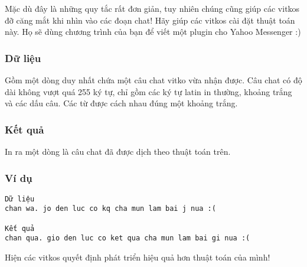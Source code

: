    Mặc dù đây là những quy tắc rất đơn giản, tuy nhiên chúng cũng giúp các vitkos đỡ căng mắt khi nhìn vào các đoạn chat! Hãy giúp các vitkos cài đặt thuật toán này. Họ sẽ dùng chương trình của bạn để viết một plugin cho Yahoo Messenger :)  

\subsubsection{   Dữ liệu  }

   Gồm một dòng duy nhất chứa một câu chat vitko vừa nhận được. Câu chat có độ dài không vượt quá 255 ký tự, chỉ gồm các ký tự latin in thường, khoảng trắng và các dấu câu. Các từ được cách nhau đúng một khoảng trắng.  

\subsubsection{   Kết quả  }

   In ra một dòng là câu chat đã được dịch theo thuật toán trên.  

\subsubsection{   Ví dụ  }
\begin{verbatim}
Dữ liệu
chan wa. jo den luc co kq cha mun lam bai j nua :(

Kết quả 
chan qua. gio den luc co ket qua cha mun lam bai gi nua :(
\end{verbatim}

   Hiện các vitkos quyết định phát triển hiệu quả hơn thuật toán của mình!  